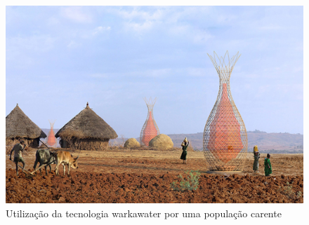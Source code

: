\begin{figure}[!htbp]
\centering
\includegraphics[scale=0.3]{editaveis/figuras/warkawater}
\caption[Utilização da tecnologia warkawater por uma população carente]{Utilização da tecnologia warkawater por uma população carente  \footnotemark}
\FloatBarrier
\label{Especificacoes}
\end{figure}

% 
% 

% 